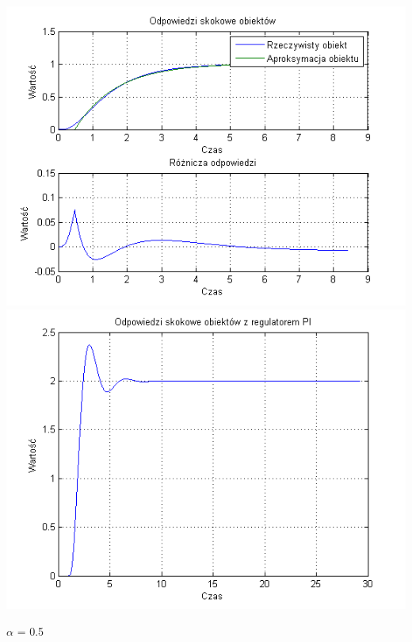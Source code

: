 \documentclass[10pt,a4paper]{article}
\begin{document}
\begin{center}
\includegraphics[scale=1]{images/jeden/skrypt_123.png}\\
\includegraphics[scale=1]{images/jeden/skrypt_124.png}\\
\end{center}
\newpage
$\alpha$ = 0.5
\end{document}

